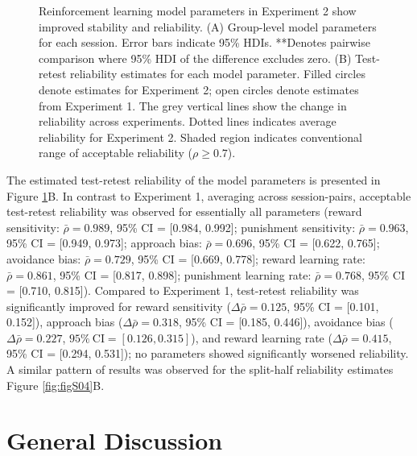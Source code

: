 \documentclass[a4paper,12pt]{article}
\begin{document}
\begin{refsection}[main]
\begin{figure}[t!]
    \centerline{}
    \caption{Reinforcement learning model parameters in Experiment 2 show improved stability and reliability. (A) Group-level model parameters for each session. Error bars indicate 95\% HDIs. **Denotes pairwise comparison where 95\% HDI of the difference excludes zero. (B) Test-retest reliability estimates for each model parameter. Filled circles denote estimates for Experiment 2; open circles denote estimates from Experiment 1. The grey vertical lines show the change in reliability across experiments. Dotted lines indicates average reliability for Experiment 2. Shaded region indicates conventional range of acceptable reliability ($\rho \geq 0.7$).}
    \label{fig:exp02_modeling}
\end{figure}

The estimated test-retest reliability of the model parameters is presented in Figure \ref{fig:exp02_modeling}B. In contrast to Experiment 1, averaging across session-pairs, acceptable test-retest reliability was observed for essentially all parameters (reward sensitivity: $\bar{\rho} = 0.989$, 95\% CI = [0.984, 0.992]; punishment sensitivity: $\bar{\rho} = 0.963$, 95\% CI = [0.949, 0.973]; approach bias: $\bar{\rho} = 0.696$, 95\% CI = [0.622, 0.765]; avoidance bias: $\bar{\rho} = 0.729$, 95\% CI = [0.669, 0.778]; reward learning rate: $\bar{\rho} = 0.861$, 95\% CI = [0.817, 0.898]; punishment learning rate: $\bar{\rho} = 0.768$, 95\% CI = [0.710, 0.815]). Compared to Experiment 1, test-retest reliability was significantly improved for reward sensitivity ($\Delta\bar{\rho} = 0.125$, 95\% CI = [0.101, 0.152]), approach bias ($\Delta\bar{\rho} = 0.318$, 95\% CI = [0.185, 0.446]), avoidance bias ($\Delta\bar{\rho} = 0.227$, $95\% \ \text{CI} = [0.126, 0.315]$), and reward learning rate ($\Delta\bar{\rho} = 0.415$, 95\% CI = [0.294, 0.531]); no parameters showed significantly worsened reliability. A similar pattern of results was observed for the split-half reliability estimates Figure \ref{fig:figS04}B.

\section*{General Discussion}


\end{refsection}
\end{document}
